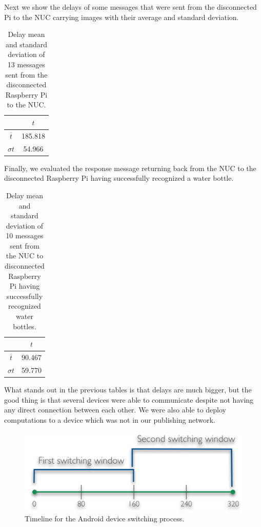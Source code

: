 \noindent Next we show the delays of some messages that were sent from the disconnected Pi to the NUC carrying images with their average and standard deviation.
\begin{table}[H]
	\centering
\begin{tabular}{c|c}\toprule
		  & $t$  \\ \midrule

$ \overline{t} $&	185.818\\
$ \sigma t $&	54.966\\
\end{tabular}
	\caption{Delay mean and standard deviation of 13 messages sent from the disconnected Raspberry Pi to the NUC.}
	\label{table:DIS2}
\end{table}

\noindent Finally, we evaluated the response message returning back from the NUC to the disconnected Raspberry Pi having successfully recognized a water bottle.

\begin{table}[H]
	\centering
	\begin{tabular}{c|c}\toprule
		& $t$  \\ \midrule
$ \overline{t} $& 	90.467\\
$ \sigma t $&	59.770\\
	\end{tabular}
	\caption{Delay mean and standard deviation of 10 messages sent from the NUC to disconnected Raspberry Pi having successfully recognized water bottles.}
	\label{table:DIS3}
\end{table}


\noindent What stands out in the previous tables is that delays are much bigger, but the good thing is that several devices were able to communicate despite not having any direct connection between each other. We were also able to deploy computations to a device which was not in our publishing network.

\begin{figure}[H]
	\centering
	\includegraphics[scale=0.6]{images/switch.png}
	\caption{Timeline for the Android device switching process.}
	\label{fig:window}
\end{figure} 


